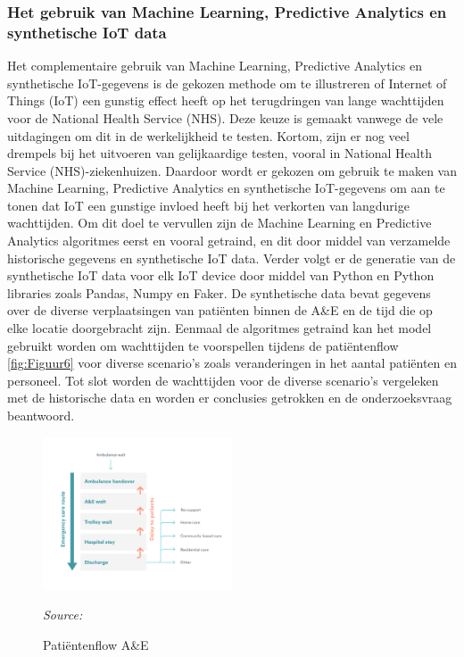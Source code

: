 \subsubsection*{Het gebruik van Machine Learning, Predictive Analytics en synthetische IoT data}
Het complementaire gebruik van Machine Learning, Predictive Analytics en synthetische IoT-gegevens is de gekozen methode om te illustreren of Internet of Things (IoT) een gunstig effect heeft op het terugdringen van lange wachttijden voor de National Health Service (NHS). Deze keuze is gemaakt vanwege de vele uitdagingen om dit in de werkelijkheid te testen. Kortom, zijn er nog veel drempels bij het uitvoeren van gelijkaardige testen, vooral in National Health Service (NHS)-ziekenhuizen. Daardoor wordt er gekozen om gebruik te maken van Machine Learning, Predictive Analytics en synthetische IoT-gegevens om aan te tonen dat IoT een gunstige invloed heeft bij het verkorten van langdurige wachttijden. Om dit doel te vervullen zijn de Machine Learning en Predictive Analytics algoritmes eerst en vooral getraind, en dit door middel van verzamelde historische gegevens en synthetische IoT data. Verder volgt er de generatie van de synthetische IoT data voor elk IoT device door middel van Python en Python libraries zoals Pandas, Numpy en Faker. De synthetische data bevat gegevens over de diverse verplaatsingen van patiënten binnen de A\&E en de tijd die op elke locatie doorgebracht zijn. Eenmaal de algoritmes getraind kan het model gebruikt worden om wachttijden te voorspellen tijdens de patiëntenflow \ref{fig:Figuur6} voor diverse scenario's zoals veranderingen in het aantal patiënten en personeel. Tot slot worden de wachttijden voor de diverse scenario's vergeleken met de historische data en worden er conclusies getrokken en de onderzoeksvraag beantwoord.

\begin{figure}[h]
    \centering
    \includegraphics[width=0.5\textwidth]{img/Figuur-7}
    \caption{Patiëntenflow A\&E}
    \label{fig:Figuur7}
    \textit{Source: \autocite{Morris}}
\end{figure}

